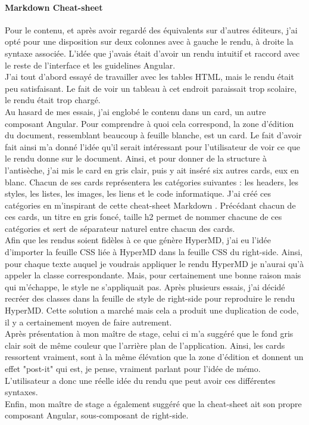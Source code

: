 \documentclass[12pt]{article}
\begin{document}
\paragraph{Markdown Cheat-sheet}
Pour le contenu, et après avoir regardé des équivalents sur d'autres éditeurs, j'ai opté pour une disposition sur deux colonnes avec à gauche le rendu, à droite la syntaxe associée. L'idée que j'avais était d'avoir un rendu intuitif et raccord avec le reste de l'interface et les guidelines Angular.\\
J'ai tout d'abord essayé de travailler avec les tables HTML, mais le rendu était peu satisfaisant. Le fait de voir un tableau à cet endroit paraissait trop scolaire, le rendu était trop chargé.\\
Au hasard de mes essais, j'ai englobé le contenu dans un card, un autre composant Angular. Pour comprendre à quoi cela correspond, la zone d'édition du document, ressemblant beaucoup à feuille blanche, est un card. Le fait d'avoir fait ainsi m'a donné l'idée qu'il serait intéressant pour l'utilisateur de voir ce que le rendu donne sur le document. Ainsi, et pour donner de la structure à l'antisèche, j'ai mis le card en gris clair, puis y ait inséré six autres cards, eux en blanc. Chacun de ses cards représentera les catégories suivantes : les headers, les styles, les listes, les images, les liens et le code informatique. J'ai créé ces catégories en m'inspirant de cette cheat-sheet Markdown \cite{mdcheat}. Précédant chacun de ces cards, un titre en gris foncé, taille h2 permet de nommer chacune de ces catégories et sert de séparateur naturel entre chacun des cards.\\
Afin que les rendus soient fidèles à ce que génère HyperMD, j'ai eu l'idée d'importer la feuille CSS liée à HyperMD dans la feuille CSS du right-side. Ainsi, pour chaque texte auquel je voudrais appliquer le rendu HyperMD je n'aurai qu'à appeler la classe correspondante. Mais, pour certainement une bonne raison mais qui m'échappe, le style ne s'appliquait pas. Après plusieurs essais, j'ai décidé recréer des classes dans la feuille de style de right-side pour reproduire le rendu HyperMD.
Cette solution a marché mais cela a produit une duplication de code, il y a certainement moyen de faire autrement.\\
Après présentation à mon maître de stage, celui ci m'a suggéré que le fond gris clair soit de même couleur que l'arrière plan de l'application. Ainsi, les cards ressortent vraiment, sont à la même élévation que la zone d'édition et donnent un effet "post-it" qui est, je pense, vraiment parlant pour l'idée de mémo. L'utilisateur a donc une réelle idée du rendu que peut avoir ces différentes syntaxes.\\
Enfin, mon maître de stage a également suggéré que la cheat-sheet ait son propre composant Angular, sous-composant de right-side.
\end{document}
